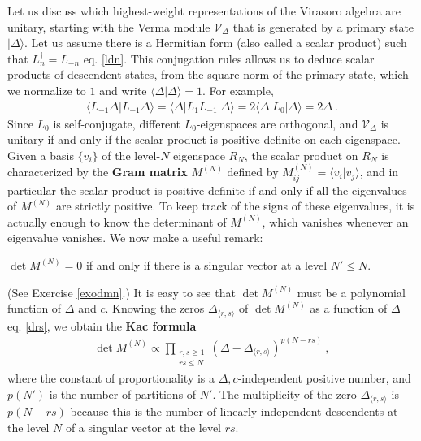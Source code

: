 \documentclass[12pt, a4paper, notitlepage, twoside]{report}
\numberwithin{equation}{section}
\theoremstyle{break}
\begin{document}
Let us discuss which highest-weight representations of the Virasoro algebra are unitary, starting with the Verma module $\mathcal V_\Delta$ that is generated by a primary state $|\Delta\rangle$. Let us assume there is a Hermitian form (also called a scalar product) such that $L_n^\dagger = L_{-n}$ eq. \eqref{ldn}.
This conjugation rules allows us to deduce scalar products of descendent states, from the square norm of the primary state, which we normalize to $1$ and write  $\langle \Delta|\Delta\rangle =1$. 
For example,
\begin{align}
 \langle L_{-1} \Delta|L_{-1}\Delta\rangle = \langle \Delta |L_1 L_{-1}|\Delta\rangle = 2\langle \Delta|L_0|\Delta\rangle = 2\Delta\ . 
\label{levo} 
\end{align}
Since $L_0$ is self-conjugate, different $L_0$-eigenspaces are orthogonal, and $\mathcal V_\Delta$ is unitary if and only if the scalar product is positive definite on each eigenspace. 
Given a basis $\{v_i\}$ of the level-$N$ eigenspace $R_N$, the scalar product on $R_N$ is characterized by the \textbf{Gram matrix} $M^{(N)}$ defined by $M^{(N)}_{ij}=\langle v_i|v_j\rangle$, and in particular the scalar product is positive definite if and only if all the eigenvalues of $M^{(N)}$ are strictly positive.
To keep track of the signs of these eigenvalues, it is actually enough to know the determinant of $M^{(N)}$, which vanishes whenever an eigenvalue vanishes. 
We now make a useful remark:
\begin{center}
 \begin{minipage}{0.9\textwidth}
 $\det M^{(N)}=0$ if and only if there is a singular vector at a level $N'\leq N$.  
 \end{minipage}
\end{center}
(See Exercise \ref{exodmn}.) 
It is easy to see that $\det M^{(N)}$ must be a polynomial function of $\Delta$ and $c$.
Knowing the zeros $\Delta_{\langle r,s \rangle}$ of $\det M^{(N)}$ as a function of $\Delta$ eq. \eqref{drs}, we obtain the \textbf{\boldmath Kac formula} 
\begin{align}
 \boxed{\det M^{(N)} \propto \prod_{\begin{smallmatrix} r,s\geq 1 \\ rs \leq N \end{smallmatrix}} (\Delta-\Delta_{\langle r,s \rangle})^{p(N-rs)}} \ ,
\end{align}
where the constant of proportionality is a $\Delta,c$-independent positive number, and $p(N')$ is the number of partitions of $N'$.
The multiplicity of the zero $\Delta_{\langle r,s \rangle}$ is $p(N-rs)$ because this is the number of linearly independent descendents at the level $N$ of a singular vector at the level $rs$.  
\end{document}
